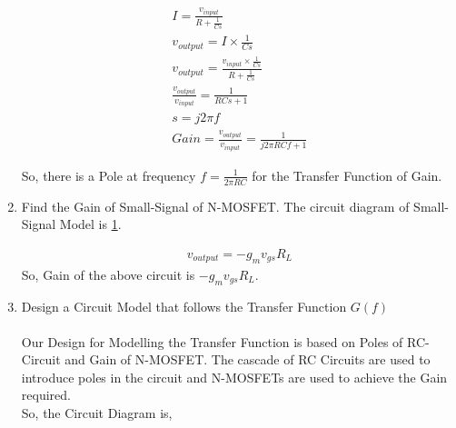\begin{enumerate}[label=\thesubsection.\arabic*.,ref=\thesubsection.\theenumi]
\solution
\begin{align}
I = \frac{v_{input}}{R + \frac{1}{Cs}}\\
v_{output} = I \times \frac{1}{Cs}\\
v_{output} = \frac{v_{input} \times \frac{1}{Cs}}{R + \frac{1}{Cs}}\\
\frac{v_{output}}{v_{input}} = \frac{1}{RCs + 1}\\
s = j2\pi f\\
Gain = \frac{v_{output}}{v_{input}} = \frac{1}{j2\pi RCf + 1}
\end{align}

So, there is a Pole at frequency $f = \frac{1}{2\pi RC}$ for the Transfer Function of Gain.\\

\item Find the Gain of Small-Signal of N-MOSFET. The circuit diagram of Small-Signal Model is \ref{fig:N-MOS Circuit}.
\begin{figure}[ht!]
	\begin{center}
		\resizebox{\columnwidth/2}{!}{}
	\end{center}
	\caption{}
	\label{fig:N-MOS Circuit}
\end{figure}

\solution
\begin{align}
v_{output} = -g_{m}v_{gs}R_{L}
\end{align}
So, Gain of the above circuit is $-g_{m}v_{gs}R_{L}$.\\

\item Design a Circuit Model that follows the Transfer Function $G(f)$\\
\solution\\
Our Design for Modelling the Transfer Function is based on Poles of RC-Circuit and Gain of N-MOSFET.
The cascade of RC Circuits are used to introduce poles in the circuit and N-MOSFETs are used to achieve the Gain required.\\

So, the Circuit Diagram is,
\begin{figure}[ht!]
	\begin{center}
		\resizebox{\columnwidth/1}{!}{}
	\end{center}
	\caption{}
	\label{fig:Circuit}
\end{figure}
 

\end{enumerate}
